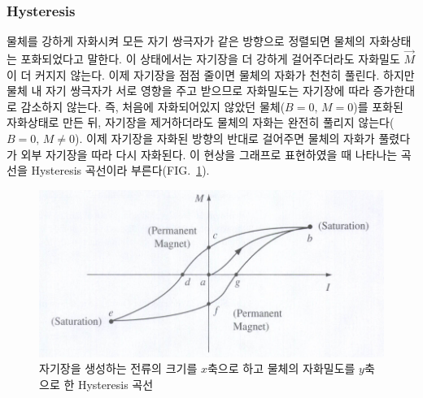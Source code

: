 \documentclass[aps,reprint,superscriptaddress,10pt]{revtex4-2}
\begin{document}
\subsubsection{Hysteresis}
물체를 강하게 자화시켜 모든 자기 쌍극자가 같은 방향으로 정렬되면 물체의 자화상태는 
포화되었다고 말한다. 이 상태에서는 자기장을 더 강하게 걸어주더라도 자화밀도 $\vec{M}$이
더 커지지 않는다. 이제 자기장을 점점 줄이면 물체의 자화가 천천히 풀린다. 하지만
물체 내 자기 쌍극자가 서로 영향을 주고 받으므로 자화밀도는 자기장에 따라 증가한대로
감소하지 않는다. 즉, 처음에 자화되어있지 않았던 물체($B=0,\,M=0$)를 포화된 자화상태로 만든 뒤, 
자기장을 제거하더라도 물체의 자화는 완전히 풀리지 않는다($B=0,\,M\neq0$). 이제 자기장을
자화된 방향의 반대로 걸어주면 물체의 자화가 풀렸다가 외부 자기장을 따라 다시 자화된다.
이 현상을 그래프로 표현하였을 때 나타나는 곡선을 Hysteresis 곡선이라 
부른다(FIG.~\ref{fig:hy}).
\begin{figure}[htbp]
  \centering
  \includegraphics[scale = 0.28]{hy.png}
  \caption{자기장을 생성하는 전류의 크기를 $x$축으로 하고
  물체의 자화밀도를 $y$축으로 한 Hysteresis 곡선}
  \label{fig:hy}
\end{figure}
\end{document}
